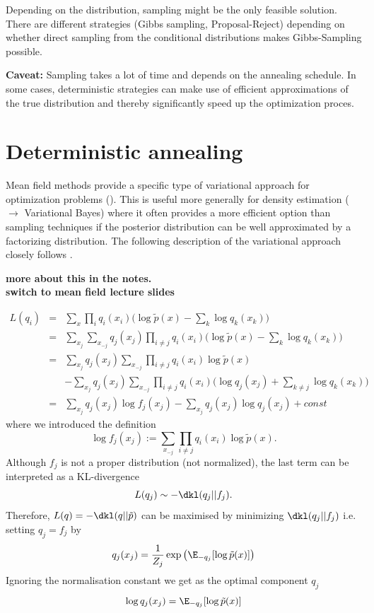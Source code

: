 Depending on the distribution, sampling might be the only feasible
solution.  There are different strategies (Gibbs sampling,
Proposal-Reject) depending on whether direct sampling from the
conditional distributions makes Gibbs-Sampling possible.


\textbf{Caveat:} Sampling takes a lot of time and depends on the
annealing schedule. In some cases, deterministic strategies can make
use of efficient approximations of the true distribution and thereby
significantly speed up the optimization proces.


\section{Deterministic annealing} \label{sec:determ-anne}

\begin{frame}

Mean field methods provide a specific type of variational approach for
optimization problems (\cite{Bishop2006,Murphy2012}). This is useful
more generally for density estimation ($\rightarrow$ Variational
Bayes) where it often provides a more efficient option than sampling
techniques if the posterior distribution can be well approximated by a
factorizing distribution. The following description of the variational
approach closely follows \citep[ch. 21.3]{Murphy2012}.

\textbf{more about this in the notes.}\\
\textbf{switch to mean field lecture slides}

\end{frame}

\begin{eqnarray*}
  \label{eq:1}
 L(q_i) & = & \sum_x \prod_i q_i(x_i) \Big( \log \tilde{p}(x) - \sum_k \log q_k(x_k) \Big) \\
 & = & \sum_{x_j} \sum_{x_{-j}} q_j (x_j) \prod_{i \neq j} q_i(x_i) \Big( \log \tilde{p}(x) - \sum_k \log q_k(x_k)   \Big) \\ 
 & = & \sum_{x_j} q_j(x_j) \sum_{x_{-j}} \prod_{i \neq j} q_i(x_i) \log \tilde{p}(x) \\
& &  - \sum_{x_j} q_j(x_j) \sum_{x_{-j}} \prod_{i \neq j} q_i(x_i) \Big(\log q_j(x_j)+ \sum_{k \neq j} \log q_k(x_k) \Big) \\ 
& = &  \sum_{x_j} q_j(x_j) \log f_j(x_j) - \sum_{x_j} q_j(x_j) \log q_j(x_j) +  const
\end{eqnarray*}
where we introduced the definition
$$
\log f_j(x_j):= \sum_{x_{-j}} \prod_{i \neq j} q_i(x_i) \log
\tilde{p}(x). 
$$
Although $f_j$ is not a proper distribution (not normalized), the last
term can be interpreted as a KL-divergence
$$
L(q_j) \sim - \dkl(q_j||f_j).
$$
Therefore, $L(q) = - \dkl(q||\tilde{p})$ can be maximised by
minimizing $\dkl(q_j||f_j)$  i.e. setting $q_j = f_j$ by
$$
q_j(x_j) = \frac{1}{Z_j} \exp\big(\E_{-q_j}[\log \tilde{p}(x)]\big)
$$
Ignoring the normalisation constant we get as the optimal component $q_j$
\begin{equation}
  \label{eq:MeanField}
\log q_j(x_j) = \E_{-q_j}[\log \tilde{p}(x)]  
\end{equation}

